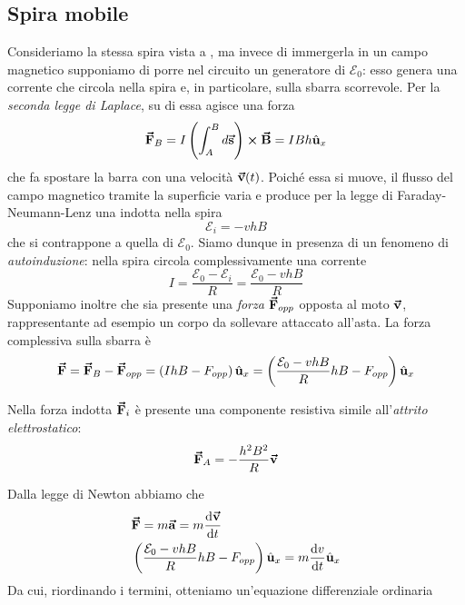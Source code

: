 \subsection{Spira mobile}
Consideriamo la stessa spira vista a \pageref{spiramobilegeneratori}, ma invece di immergerla in un campo magnetico supponiamo di porre nel circuito un generatore di \fem $\mathcal{E}_0$: esso genera una corrente che circola nella spira e, in particolare, sulla sbarra scorrevole. Per la \textit{seconda legge di Laplace}, su di essa agisce una forza
\begin{equation*}
	\vb*{\va{F}}_B=I\left(\int_{A}^{B}d\vb*{\va{s}}\right)\cross\vb*{\va{B}}=IBh\hat{\mathbf{u}}_x
\end{equation*}
che fa spostare la barra con una velocità $\vb*{\va{v}}(t)$. Poiché essa si muove, il flusso del campo magnetico tramite la superficie varia e produce per la legge di Faraday-Neumann-Lenz una \fem indotta nella spira
\begin{equation*}
	\mathcal{E}_{i}=-vhB
\end{equation*}
che si contrappone a quella di $\mathcal{E}_0$. Siamo dunque in presenza di un fenomeno di \textit{autoinduzione}: nella spira circola complessivamente una corrente
\begin{equation*}
	I=\frac{\mathcal{E}_0-\mathcal{E}_i}{R}=\frac{\mathcal{E}_0-vhB}{R}
\end{equation*}
Supponiamo inoltre che sia presente una \textit{forza} $\vb*{\va{F}}_{opp}$ opposta al moto $\vb*{\va{v}}$, rappresentante ad esempio un corpo da sollevare attaccato all'asta. La forza complessiva sulla sbarra è
\begin{equation*}
	\vb*{\va{F}}=\vb*{\va{F}}_B-\vb*{\va{F}}_{opp}=\left(IhB-F_{opp}\right)\hat{\mathbf{u}}_x=\left(\frac{\mathcal{E}_0-vhB}{R}hB-F_{opp}\right)\hat{\mathbf{u}}_x
\end{equation*}
\begin{observe}
	Nella forza indotta $\vb*{\va{F}}_i$ è presente una componente resistiva simile all'\textit{attrito elettrostatico}:
	\begin{equation*}
		\vb*{\va{F}}_A=-\frac{h^2B^2}{R}\vb*{\va{v}}
	\end{equation*}
\end{observe}
Dalla legge di Newton abbiamo che
\begin{align*}
	&\vb*{\va{F}}=m\vb*{\va{a}}=m\dv{\vb*{\va{v}}}{t}\\
	&\left(\frac{\mathcal{E}_0-vhB}{R}hB-F_{opp}\right)\hat{\mathbf{u}}_x=m\dv{v}{t}\hat{\mathbf{u}}_x\\
\end{align*}
Da cui, riordinando i termini, otteniamo un'equazione differenziale ordinaria

